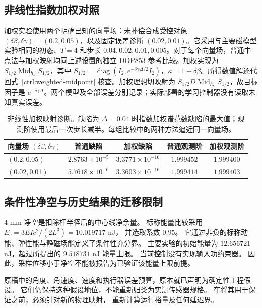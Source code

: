 \subsection{非线性指数加权对照}
\label{sx:framework-weighted}
加权实验使用两个明确已知的向量场：未补偿合成受控对象 $(\delta\beta,\delta\gamma)=(0.2,0.05)$，以及固定误差诊断 $(0.02,0.01)$。它采用与主要磁模型实验相同的初态、$T=4$ 和步长 $0.04,0.02,0.01,0.005$。对于每个向量场，普通中点法与加权映射均同上述设置的独立 DOP853 参考比较。加权实现为 $S_{1/2}\operatorname{Mid}_{h_\kappa}S_{1/2}$，其中 $S_{1/2}=\operatorname{diag}(I_2,e^{-\delta\gamma\Delta/2}I_2)$，$\kappa=1+\delta\beta$。所得数值解还代回式~\eqref{ctrl:weighted-midpoint} 核查。加权理想切映射为 $S_{1/2}D\operatorname{Mid}_{h_\kappa}S_{1/2}$，故目标因子是 $e^{-\delta\gamma\Delta}$。两个模型及全部误差分别记录；实际部署的学习控制器没有读取未知真实误差。

\begin{table}[t]
\centering
\caption{非线性加权映射诊断。缺陷为 $\Delta=0.04$ 时指数加权谱范数缺陷的最大值；观测阶使用最后一次步长减半。每组比较中的两种方法逼近同一向量场。}
\label{num:nonlinear-weighted}
\begin{tabular}{lcccc}
\toprule
向量场 $(\delta\beta,\delta\gamma)$ & 普通缺陷 & 加权缺陷 & 普通观测阶 & 加权观测阶\\
\midrule
$(0.2,0.05)$ & $2.8763\times10^{-5}$ & $3.3771\times10^{-16}$ & $1.999452$ & $1.999400$ \\
$(0.02,0.01)$ & $5.7618\times10^{-6}$ & $3.3603\times10^{-16}$ & $1.999414$ & $1.999403$ \\
\bottomrule
\end{tabular}
\end{table}

\subsection{条件性净空与历史结果的迁移限制}
\label{sx:migration}
$4$ mm 净空是扣除杆半径后的中心线净余量。
标称能量比较采用 $E_c=3EIc^2/(2L^3)=10.019717$ nJ，
并选取系数 $0.95$。
它通过非负的标称动能、弹性能与静磁场能定义了条件性充分界。
主要实验的初始能量为 $12.656721$ nJ，超过所提出的 $9.518731$ nJ 能量上限。
当前控制没有实现输入功约束器。
因此，采样位移小于净空不能被报告为已验证该能量上限前提。

原稿中的角度、角速度、速度和执行器误差预算，原本就已声明为确定性工程假设。
它们仍保持这种假设地位，不能重新归类为实测传感器规格。
在将其用于保证之前，必须针对新的物理映射，
重新计算运行裕量及任何延迟界。

